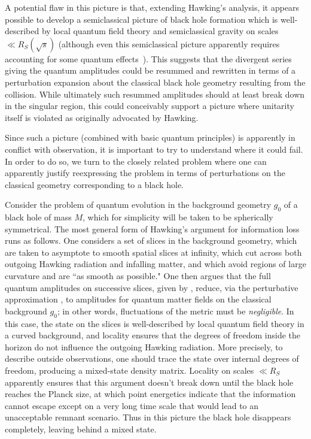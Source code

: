 A potential flaw in this picture is that, extending Hawking's analysis, it appears possible to develop a semiclassical picture of black hole formation which is well-described by local quantum field theory and semiclassical gravity on scales $\ll R_S(\sqrt s)$ (although even this semiclassical picture apparently requires accounting for some quantum effects~).  This suggests that the divergent series giving the quantum amplitudes could be resummed and rewritten in terms of a perturbation expansion about the classical black hole geometry resulting from the collision.  While ultimately such resummed amplitudes should at least break down in the singular region, this could conceivably support a picture where unitarity itself is violated as originally advocated by Hawking.

Since such a picture (combined with basic quantum principles) is apparently in conflict with observation, it is important to try to understand where it could fail.  In order to do so, we turn to the closely related problem where one can apparently justify reexpressing the problem in terms of perturbations on the classical geometry corresponding to a black hole.


Consider the problem of quantum evolution in the background geometry $g_0$ of a black hole of mass $M$, which for simplicity will be taken to be spherically symmetrical.  The most general form of Hawking's argument for information loss runs as follows.  One considers a set of slices in the background geometry, which are taken to asymptote to smooth spatial slices at infinity, which cut across both outgoing Hawking radiation and infalling matter, and which avoid regions of large curvature and are  ``as smooth as possible."   One then argues that the full quantum amplitudes on successive slices, given by \gravfunc, reduce, via the perturbative approximation \gravpert, to amplitudes for quantum matter fields on the classical background $g_0$; in other words, fluctuations of the metric must be {\it negligible}.  In this case, the state on the slices is well-described by local quantum field theory in a curved background, and locality ensures that the degrees of freedom inside the horizon do not influence the outgoing Hawking radiation.  More precisely, to describe outside observations, one should trace the state over internal degrees of freedom, producing a mixed-state density matrix.  Locality on scales $\ll R_S$ apparently ensures that this argument doesn't break down until the black hole reaches the Planck size, at which point energetics indicate that the information cannot escape except on a very long time scale that would lead to an unacceptable remnant scenario.  Thus in this picture the black hole disappears completely, leaving behind a mixed state.

